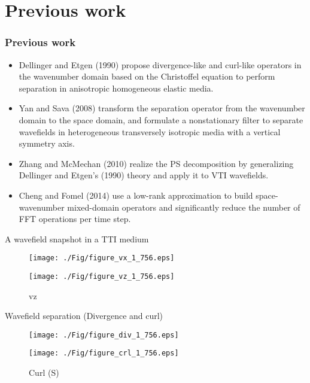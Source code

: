 \documentclass[aspectratio=169]{beamer}
\begin{document}
\section{Previous work}
\begin{frame}
  \frametitle{Previous work}
\begin{itemize}
\item{Dellinger and Etgen (1990) propose divergence-like and curl-like operators in the wavenumber domain based on the Christoffel equation to perform separation in anisotropic homogeneous elastic media.}
\item{Yan and Sava (2008) transform the separation operator from the wavenumber domain to the space domain, and formulate a nonstationary filter to separate wavefields in heterogeneous transversely isotropic media with a vertical symmetry axis.}
\item{Zhang and McMechan (2010) realize the PS decomposition by generalizing Dellinger and Etgen's (1990) theory and apply it to VTI wavefields.}
\item{Cheng and Fomel (2014) use a low-rank approximation to build space-wavenumber mixed-domain operators and significantly reduce the number of FFT operations per time step.}
\end{itemize}
\end{frame}
\begin{frame}{A wavefield snapshot in a TTI medium}
   \begin{figure}[ht]
        \begin{minipage}[b]{0.45\linewidth}
            \centering
            \texttt{[image: ./Fig/figure\_vx\_1\_756.eps]}
            \caption{vx}
        \end{minipage}
        \hspace{0.5cm}
        \begin{minipage}[b]{0.45\linewidth}
            \centering
            \texttt{[image: ./Fig/figure\_vz\_1\_756.eps]}
            \caption{vz}
        \end{minipage}
    \end{figure}

\end{frame}
\begin{frame}{Wavefield separation (Divergence and curl)}
   \begin{figure}[ht]
        \begin{minipage}[b]{0.45\linewidth}
            \centering
            \texttt{[image: ./Fig/figure\_div\_1\_756.eps]}
            \caption{Divergence (P)}
        \end{minipage}
        \hspace{0.5cm}
        \begin{minipage}[b]{0.45\linewidth}
            \centering
            \texttt{[image: ./Fig/figure\_crl\_1\_756.eps]}
            \caption{Curl (S)}
        \end{minipage}
    \end{figure}
\end{frame}
\end{document}
